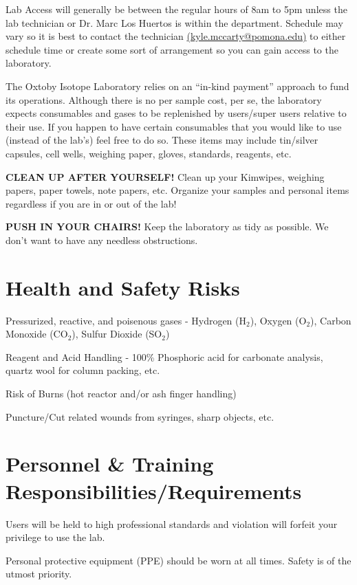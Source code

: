 \documentclass[12pt]{../SOP4_alpha}\usepackage[]{graphicx}\usepackage[]{color}
\begin{document}
\NP Lab Access will generally be between the regular hours of 8am to 5pm unless the lab technician or Dr. Marc Los Huertos is within the department. Schedule may vary so it is best to contact the technician \href{mailto:kyle.mccarty@pomona.edu}{(kyle.mccarty@pomona.edu)} to either schedule time or create some sort of arrangement so you can gain access to the laboratory.

\NP The Oxtoby Isotope Laboratory relies on an ``in-kind payment'' approach to fund its operations. Although there is no per sample cost, per se, the laboratory expects consumables and gases to be replenished by users/super users relative to their use. If you happen to have certain consumables that you would like to use (instead of the lab's) feel free to do so. These items may include tin/silver capsules, cell wells, weighing paper, gloves, standards, reagents, etc.

\NP \textbf{CLEAN UP AFTER YOURSELF!} Clean up your Kimwipes, weighing papers, paper towels, note papers, etc. Organize your samples and personal items regardless if you are in or out of the lab!

\NP \textbf{PUSH IN YOUR CHAIRS!} Keep the laboratory as tidy as possible. We don't want to have any needless obstructions.

\section{Health and Safety Risks}

\NP Pressurized, reactive, and poisenous gases - Hydrogen (H$_2$), Oxygen (O$_2$), Carbon Monoxide (CO$_2$), Sulfur Dioxide (SO$_2$)

\NP Reagent and Acid Handling - 100\% Phosphoric acid for carbonate analysis, quartz wool for column packing, etc. 

\NP Risk of Burns (hot reactor and/or ash finger handling)

\NP Puncture/Cut related wounds from syringes, sharp objects, etc.

\section{Personnel \& Training Responsibilities/Requirements}

\NP Users will be held to high professional standards and violation will forfeit your privilege to use the lab.

\NP Personal protective equipment (PPE) should be worn at all times. Safety is of the utmost priority.
\end{document}
